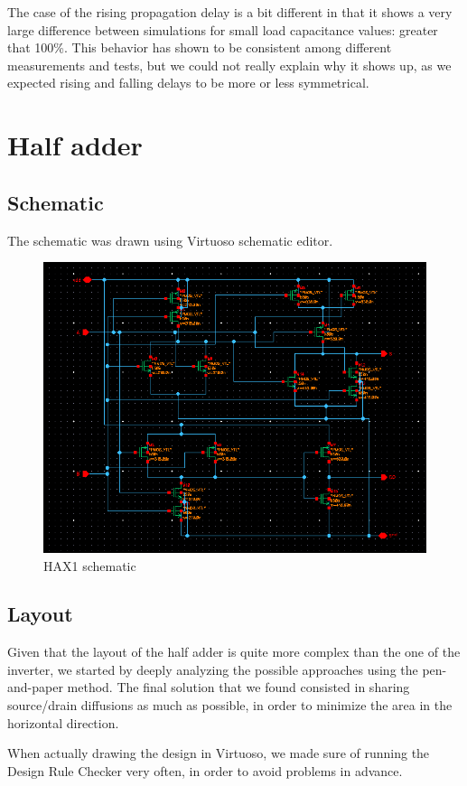 \documentclass[a4paper]{article}
\begin{document}
The case of the rising propagation delay is a bit different in that it shows a very large difference between simulations for small load capacitance values: greater that 100\%. This behavior has shown to be consistent among different measurements and tests, but we could not really explain why it shows up, as we expected rising and falling delays to be more or less symmetrical.

\section{Half adder}
\subsection{Schematic}
The schematic was drawn using Virtuoso schematic editor.

\begin{figure}[H]
      \centering
       \includegraphics[width=12cm]{./Images/HA/HAX1_schematic.png}
\caption{HAX1 schematic}
\label{fig: HAX1_sch}
\end{figure}

\subsection{Layout}
Given that the layout of the half adder is quite more complex than the one of the inverter, we started by deeply analyzing the possible approaches using the pen-and-paper method. The final solution that we found consisted in sharing source/drain diffusions as much as possible, in order to minimize the area in the horizontal direction.

When actually drawing the design in Virtuoso, we made sure of running the Design Rule Checker very often, in order to avoid problems in advance.
\end{document}
